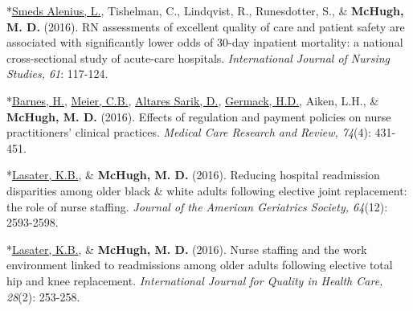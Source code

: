 \documentclass[10pt,]{article}
\begin{document}
{{{{{{{{{{{{{{{\begin{hangparas}{.25in}{1}
\end{hangparas}

\vspace{4mm}

\begin{hangparas}{.25in}{1}

*{\underline {Smeds Alenius, L.}}, Tishelman, C., Lindqvist, R., Runesdotter, S., \& {\textbf {McHugh, M. D.}} (2016). RN assessments of excellent quality of care and patient safety are associated with significantly lower odds of 30-day inpatient mortality: a national cross-sectional study of acute-care hospitals. {\textit {International Journal of Nursing Studies, 61}}: 117-124.

\end{hangparas}

\vspace{4mm}

\begin{hangparas}{.25in}{1}

*{\underline {Barnes, H.}}, {\underline {Meier, C.B.}}, {\underline {Altares Sarik, D.}}, {\underline {Germack, H.D.}}, Aiken, L.H., \& {\textbf {McHugh, M. D.}} (2016). Effects of regulation and payment policies on nurse practitioners' clinical practices. {\textit {Medical Care Research and Review, 74}}(4): 431-451.

\end{hangparas}

\vspace{4mm}

\begin{hangparas}{.25in}{1}

*{\underline {Lasater, K.B.}}, \& {\textbf {McHugh, M. D.}} (2016). Reducing hospital readmission disparities among older black \& white adults following elective joint replacement: the role of nurse staffing. {\textit {Journal of the American Geriatrics Society, 64}}(12): 2593-2598.

\end{hangparas}

\vspace{4mm}

\begin{hangparas}{.25in}{1}

*{\underline {Lasater, K.B.}}, \& {\textbf {McHugh, M. D.}} (2016). Nurse staffing and the work environment linked to readmissions among older adults following elective total hip and knee replacement. {\textit {International Journal for Quality in Health Care, 28}}(2): 253-258.


\end{hangparas}}}}}}}}}}}}}}}}
\end{document}
